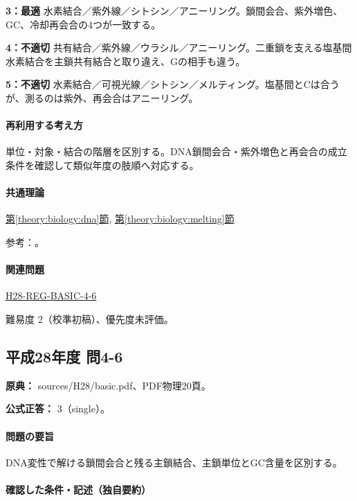 \noindent\textbf{3：最適} 水素結合／紫外線／シトシン／アニーリング。鎖間会合、紫外増色、GC、冷却再会合の4つが一致する。\par

\noindent\textbf{4：不適切} 共有結合／紫外線／ウラシル／アニーリング。二重鎖を支える塩基間水素結合を主鎖共有結合と取り違え、Gの相手も違う。\par

\noindent\textbf{5：不適切} 水素結合／可視光線／シトシン／メルティング。塩基間とCは合うが、測るのは紫外、再会合はアニーリング。\par

\paragraph{再利用する考え方} 単位・対象・結合の階層を区別する。DNA鎖間会合・紫外増色と再会合の成立条件を確認して類似年度の肢順へ対応する。

\paragraph{共通理論} \hyperref[theory:biology:dna]{第\ref*{theory:biology:dna}節}, \hyperref[theory:biology:melting]{第\ref*{theory:biology:melting}節}

\par 参考：\cite{bu_dna_melting,nhgri_dna}。

\paragraph{関連問題} \hyperref[q:h28-reg-basic-4-6]{H28-REG-BASIC-4-6}

\par 難易度 2（校準初稿）、優先度未評価。

\subsection{平成28年度 問4-6}
\label{q:h28-reg-basic-4-6}

\noindent\textbf{原典：} sources/H28/basic.pdf、PDF物理20頁。

\textbf{公式正答：} 3（single）。

\paragraph{問題の要旨} DNA変性で解ける鎖間会合と残る主鎖結合、主鎖単位とGC含量を区別する。

\paragraph{確認した条件・記述（独自要約）}\mbox{}\par

